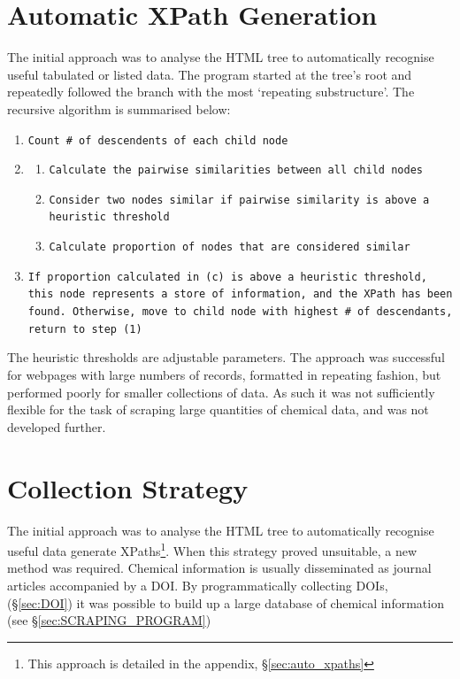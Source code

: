 \section{Automatic XPath Generation}
The initial approach was to analyse the HTML tree to automatically recognise useful tabulated or listed data. The program started at the tree's root and repeatedly followed the branch with the most `repeating substructure'. The recursive algorithm is summarised below:
\begin{sloppypar}
\begin{enumerate}
\item \texttt{Count \# of descendents of each child node}
\item \begin{enumerate}
\item \texttt{Calculate the pairwise similarities between all child nodes}
\item \texttt{Consider  two nodes similar if pairwise similarity is above a heuristic threshold}
\item \texttt{Calculate proportion of nodes that are considered similar}
\end{enumerate}
\item \texttt{If proportion calculated in (c) is above a heuristic threshold, this node represents a store of information, and the XPath has been found. Otherwise, move to child node with highest \# of descendants, return to step (1)}
\end{enumerate}
\end{sloppypar}
The heuristic thresholds are adjustable parameters. The approach was successful for webpages with large numbers of records, formatted in repeating fashion, but performed poorly for smaller collections of data. As such it was not sufficiently flexible for the task of scraping large quantities of chemical data, and was not developed further.
\section{Collection Strategy}
The initial approach was to analyse the HTML tree to automatically recognise useful data generate XPaths\footnote{This approach is detailed in the appendix, \S\ref{sec:auto_xpaths}}. When this strategy proved unsuitable, a new method was required. Chemical information is usually disseminated as journal articles accompanied by a DOI. By programmatically collecting DOIs, (\S\ref{sec:DOI}) it was possible to build up a large database of chemical information (see \S\ref{sec:SCRAPING_PROGRAM})

